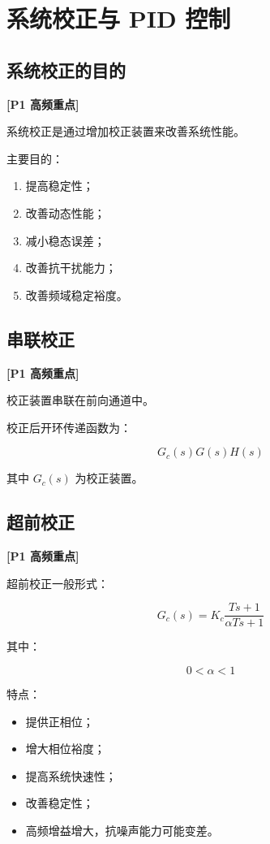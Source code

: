 \documentclass[UTF8,a4paper,12pt]{ctexart}
\newcommand{\Pone}{\textcolor{p1}{\textbf{[P1 高频重点]}}}
\begin{document}
\section{系统校正与 PID 控制}

\subsection{系统校正的目的}

\Pone

系统校正是通过增加校正装置来改善系统性能。

主要目的：

\begin{enumerate}
    \item 提高稳定性；
    \item 改善动态性能；
    \item 减小稳态误差；
    \item 改善抗干扰能力；
    \item 改善频域稳定裕度。
\end{enumerate}

\subsection{串联校正}

\Pone

校正装置串联在前向通道中。

校正后开环传递函数为：

\[
G_c(s)G(s)H(s)
\]

其中 $G_c(s)$ 为校正装置。

\subsection{超前校正}

\Pone

超前校正一般形式：

\[
G_c(s)=K_c\frac{Ts+1}{\alpha Ts+1}
\]

其中：

\[
0<\alpha<1
\]

特点：

\begin{itemize}
    \item 提供正相位；
    \item 增大相位裕度；
    \item 提高系统快速性；
    \item 改善稳定性；
    \item 高频增益增大，抗噪声能力可能变差。
\end{itemize}
\end{document}
